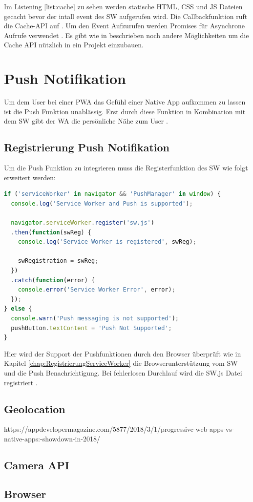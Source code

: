 Im Listening \ref{list:cache} zu sehen werden statische HTML, CSS und JS Dateien gecacht bevor der intall event des \acs{SW} aufgerufen wird. Die Callbackfunktion ruft die Cache-API auf \cite{CacheAPI}.
Um den Event Aufzurufen werden Promises für Asynchrone Aufrufe verwendet \cite{Promises}.
Es gibt wie in \cite{CacheAPI} beschrieben noch andere Möglichkeiten um die Cache API nützlich in ein Projekt einzubauen.
\newpage

\section{Push Notifikation}
Um dem User bei einer \acs{PWA} das Gefühl einer Native App aufkommen zu lassen ist die Push Funktion unablässig. Erst durch diese Funktion in Kombination mit dem \acs{SW} gibt der \acl{WA} die persönliche Nähe zum User \cite{PushNotifikation}.



\subsection{Registrierung Push Notifikation}
Um die Push Funktion zu integrieren muss die Registerfunktion des \acs{SW} wie folgt erweitert werden:
 
\begin{lstlisting}[language=JavaScript, caption={Push Notifications},label=lst:PushNotifikation, xleftmargin=50pt]
if ('serviceWorker' in navigator && 'PushManager' in window) {
  console.log('Service Worker and Push is supported');

  navigator.serviceWorker.register('sw.js')
  .then(function(swReg) {
    console.log('Service Worker is registered', swReg);

    swRegistration = swReg;
  })
  .catch(function(error) {
    console.error('Service Worker Error', error);
  });
} else {
  console.warn('Push messaging is not supported');
  pushButton.textContent = 'Push Not Supported';
}
\end{lstlisting}

Hier wird der Support der Pushfunktionen durch den Browser überprüft wie in \\ Kapitel \ref{chap:RegistrierungServiceWorker} die Browserunterstützung vom \acs{SW} und die Push Benachrichtigung. Bei fehlerlosen Durchlauf wird die \acs{SW}.js Datei registriert \cite{PushNotifikation}.

\newpage



\subsection{Geolocation}
https://appdevelopermagazine.com/5877/2018/3/1/progressive-web-apps-vs-native-apps:-showdown-in-2018/


\subsection{Camera API}


\subsection{Browser} 





